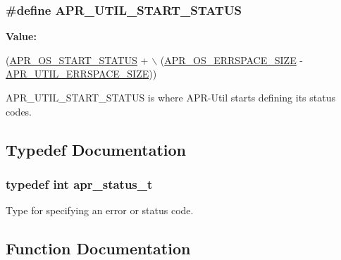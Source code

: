 \subsubsection[{\texorpdfstring{A\+P\+R\+\_\+\+U\+T\+I\+L\+\_\+\+S\+T\+A\+R\+T\+\_\+\+S\+T\+A\+T\+US}{APR_UTIL_START_STATUS}}]{\setlength{\rightskip}{0pt plus 5cm}\#define A\+P\+R\+\_\+\+U\+T\+I\+L\+\_\+\+S\+T\+A\+R\+T\+\_\+\+S\+T\+A\+T\+US}\hypertarget{group__apr__errno_gadf26297a72afa0ea224e7097fe59a1cd}{}\label{group__apr__errno_gadf26297a72afa0ea224e7097fe59a1cd}
{\bfseries Value\+:}
\begin{DoxyCode}
(\hyperlink{group__apr__errno_ga450e1a5734732e092ddaa5b67414f69b}{APR\_OS\_START\_STATUS} + \(\backslash\)
                           (\hyperlink{group__apr__errno_gadb8d97e6836ccdc57b43b6119a5acccf}{APR\_OS\_ERRSPACE\_SIZE} - 
      \hyperlink{group__apr__errno_gaef5e79630739f24d1512d0d044c2bae7}{APR\_UTIL\_ERRSPACE\_SIZE}))
\end{DoxyCode}
A\+P\+R\+\_\+\+U\+T\+I\+L\+\_\+\+S\+T\+A\+R\+T\+\_\+\+S\+T\+A\+T\+US is where A\+P\+R-\/\+Util starts defining its status codes. 

\subsection{Typedef Documentation}
\subsubsection[{\texorpdfstring{apr\+\_\+status\+\_\+t}{apr_status_t}}]{\setlength{\rightskip}{0pt plus 5cm}typedef int {\bf apr\+\_\+status\+\_\+t}}\hypertarget{group__apr__errno_gaf76ee4543247e9fb3f3546203e590a6c}{}\label{group__apr__errno_gaf76ee4543247e9fb3f3546203e590a6c}
Type for specifying an error or status code. 

\subsection{Function Documentation}
